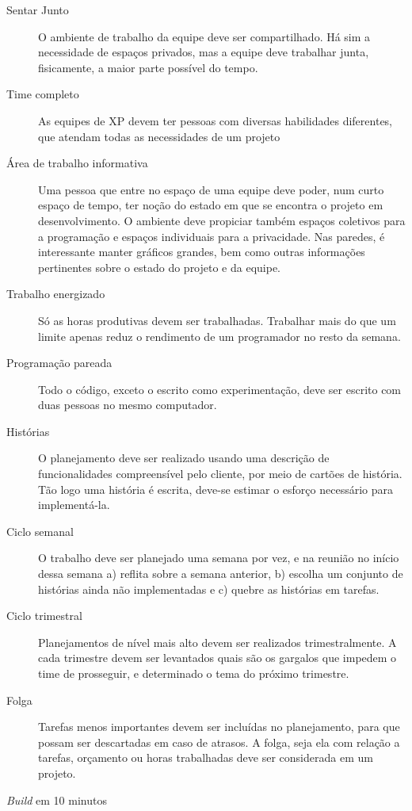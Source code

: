     \begin{description}
      \item[Sentar Junto]
      O ambiente de trabalho da equipe deve ser compartilhado. Há sim a necessidade de espaços privados, mas a equipe deve trabalhar junta, fisicamente, a maior parte possível do tempo.
      \item[Time completo]
      As equipes de XP devem ter pessoas com diversas habilidades diferentes, que atendam todas as necessidades de um projeto
      \item[Área de trabalho informativa]
      Uma pessoa que entre no espaço de uma equipe deve poder, num curto espaço de tempo, ter noção do estado em que se encontra o projeto em desenvolvimento. O ambiente deve propiciar também espaços coletivos para a programação e espaços individuais para a privacidade. Nas paredes, é interessante manter gráficos grandes, bem como outras informações pertinentes sobre o estado do projeto e da equipe.
      \item[Trabalho energizado]
      Só as horas produtivas devem ser trabalhadas. Trabalhar mais do que um limite apenas reduz o rendimento de um programador no resto da semana.
      \item[Programação pareada]
      Todo o código, exceto o escrito como experimentação, deve ser escrito com duas pessoas no mesmo computador.
      \item[Histórias]
      O planejamento deve ser realizado usando uma descrição de funcionalidades compreensível pelo cliente, por meio de cartões de história. Tão logo uma história é escrita, deve-se estimar o esforço necessário para implementá-la.
      \item[Ciclo semanal]
      O trabalho deve ser planejado uma semana por vez, e na reunião no início dessa semana a) reflita sobre a semana anterior, b) escolha um conjunto de histórias ainda não implementadas e c) quebre as histórias em tarefas.
      \item[Ciclo trimestral]
      Planejamentos de nível mais alto devem ser realizados trimestralmente. A cada trimestre devem ser levantados quais são os gargalos que impedem o time de prosseguir, e determinado o tema do próximo trimestre.
      \item[Folga]
      Tarefas menos importantes devem ser incluídas no planejamento, para que possam ser descartadas em caso de atrasos. A folga, seja ela com relação a tarefas, orçamento ou horas trabalhadas deve ser considerada em um projeto.
      \item[\textit{Build} em 10 minutos]

\end{description}

